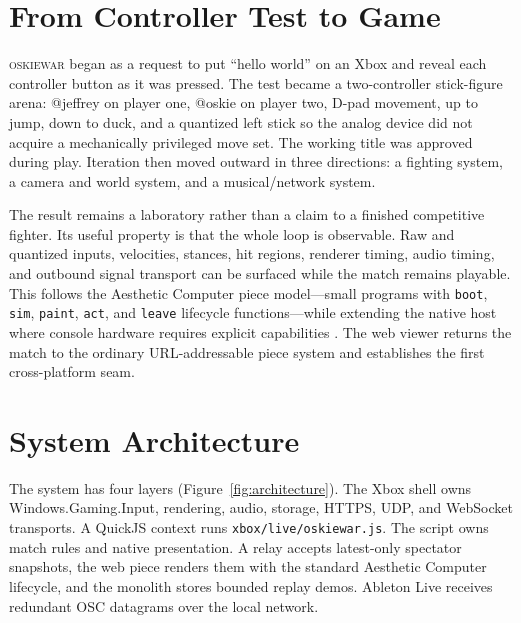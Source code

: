 \documentclass[10pt,letterpaper,twocolumn]{article}
\newcommand{\game}{\textsc{oskiewar}}
\newcommand{\code}[1]{\texttt{#1}}
\begin{document}
\section{From Controller Test to Game}

\game{} began as a request to put ``hello world'' on an Xbox and reveal each controller button as it was pressed. The test became a two-controller stick-figure arena: @jeffrey on player one, @oskie on player two, D-pad movement, up to jump, down to duck, and a quantized left stick so the analog device did not acquire a mechanically privileged move set. The working title was approved during play. Iteration then moved outward in three directions: a fighting system, a camera and world system, and a musical/network system.

The result remains a laboratory rather than a claim to a finished competitive fighter. Its useful property is that the whole loop is observable. Raw and quantized inputs, velocities, stances, hit regions, renderer timing, audio timing, and outbound signal transport can be surfaced while the match remains playable. This follows the Aesthetic Computer piece model---small programs with \code{boot}, \code{sim}, \code{paint}, \code{act}, and \code{leave} lifecycle functions---while extending the native host where console hardware requires explicit capabilities \cite{scudderPieces,scudderOS}. The web viewer returns the match to the ordinary URL-addressable piece system and establishes the first cross-platform seam.

\section{System Architecture}

The system has four layers (Figure~\ref{fig:architecture}). The Xbox shell owns Windows.Gaming.Input, rendering, audio, storage, HTTPS, UDP, and WebSocket transports. A QuickJS context runs \code{xbox/live/oskiewar.js}. The script owns match rules and native presentation. A relay accepts latest-only spectator snapshots, the web piece renders them with the standard Aesthetic Computer lifecycle, and the monolith stores bounded replay demos. Ableton Live receives redundant OSC datagrams over the local network.
\end{document}
